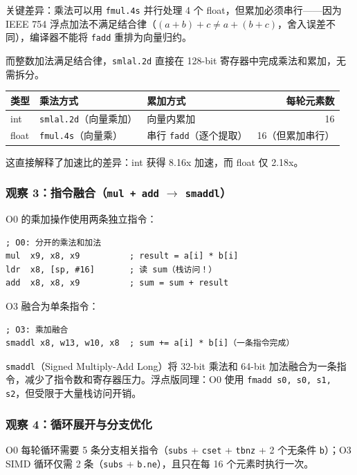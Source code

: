 \documentclass[12pt,a4paper]{article}
\begin{document}
关键差异：乘法可以用 \texttt{fmul.4s} 并行处理 4 个 float，但累加必须串行——因为 IEEE 754 浮点加法不满足结合律（$(a+b)+c \neq a+(b+c)$，舍入误差不同），编译器不能将 \texttt{fadd} 重排为向量归约。

而整数加法满足结合律，\texttt{smlal.2d} 直接在 128-bit 寄存器中完成乘法和累加，无需拆分。

\begin{table}[H]
\centering
\begin{tabular}{l l l r}
\toprule
类型 & 乘法方式 & 累加方式 & 每轮元素数 \\
\midrule
int & \texttt{smlal.2d}（向量乘加） & 向量内累加 & 16 \\
float & \texttt{fmul.4s}（向量乘） & 串行 \texttt{fadd}（逐个提取） & 16（但累加串行） \\
\bottomrule
\end{tabular}
\end{table}

这直接解释了加速比的差异：int 获得 8.16x 加速，而 float 仅 2.18x。

\subsubsection{观察 3：指令融合（\texttt{mul + add} $\to$ \texttt{smaddl}）}

O0 的乘加操作使用两条独立指令：

\begin{lstlisting}
; O0: 分开的乘法和加法
mul  x9, x8, x9          ; result = a[i] * b[i]
ldr  x8, [sp, #16]       ; 读 sum（栈访问！）
add  x8, x8, x9          ; sum = sum + result
\end{lstlisting}

O3 融合为单条指令：

\begin{lstlisting}
; O3: 乘加融合
smaddl x8, w13, w10, x8  ; sum += a[i] * b[i]（一条指令完成）
\end{lstlisting}

\texttt{smaddl}（Signed Multiply-Add Long）将 32-bit 乘法和 64-bit 加法融合为一条指令，减少了指令数和寄存器压力。浮点版同理：O0 使用 \texttt{fmadd s0, s0, s1, s2}，但受限于大量栈访问开销。

\subsubsection{观察 4：循环展开与分支优化}

O0 每轮循环需要 5 条分支相关指令（\texttt{subs} + \texttt{cset} + \texttt{tbnz} + 2 个无条件 \texttt{b}）；O3 SIMD 循环仅需 2 条（\texttt{subs} + \texttt{b.ne}），且只在每 16 个元素时执行一次。
\end{document}
